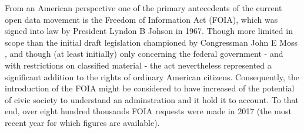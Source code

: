 From an American perspective one of the primary antecedents of the current open data movement is the Freedom of Information Act \cite{foia} (FOIA), which was signed into law by President Lyndon B Johson \cite{lbj} in 1967.
Though more limited in scope than the initial draft legislation championed by Congressman John E Moss \cite{john-e-moss}, and though (at least initially) only concerning the federal government - and with restrictions on classified material - the act nevertheless represented a significant addition to the rights of ordinary American citizens.
Consequently, the introduction of the FOIA might be considered to have increased of the potential of civic society to understand an adminstration and it hold it to account.
To that end, over eight hundred thousands FOIA requests were made in 2017 \cite{foia-requests} (the most recent year for which figures are available).
